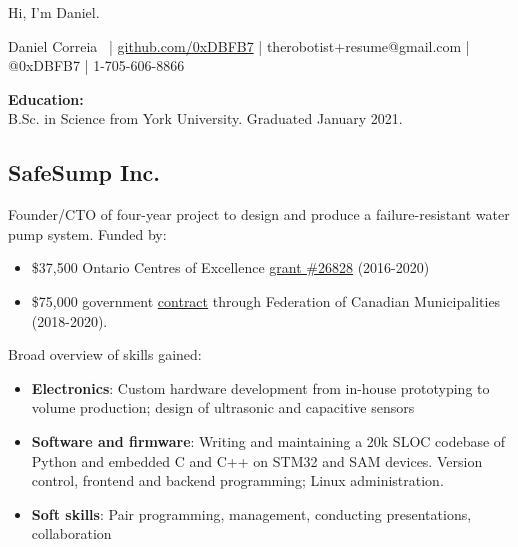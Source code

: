 \documentclass[fleqn,11pt]{article}
\begin{document}
\begingroup
{}\selectfont

{\Huge Hi, I'm Daniel.}

\endgroup


\small{{Daniel Correia}\  | \href{https://github.com/0xDBFB7}{github.com/0xDBFB7} | therobotist+resume@gmail.com | @0xDBFB7 | 1-705-606-8866\\
\light{\makebox[\linewidth]{\rule{\textwidth}{0.4pt}}}

\begin{multicols}{1}

\begin{tcolorbox}
\textbf{Education:\\}
B.Sc. in Science from York University. Graduated January 2021.
\end{tcolorbox}

\subsection*{SafeSump Inc.}

Founder/CTO of four-year project to design and produce a failure-resistant water pump system. Funded by:
%
\begin{itemize}
\item \$37,500 Ontario Centres of Excellence  \href{https://drive.google.com/file/d/1WXrxVwTggaL7WEvLv6DgJ891fSo7LqqP/view?usp=sharing}{grant \#26828} (2016-2020)
\item \$75,000 government \href{https://drive.google.com/file/d/11pdJNzYDE-28X3m0rH8mE4cxoliTJZGH/view?usp=sharing}{contract} through Federation of Canadian Municipalities (2018-2020).
\end{itemize}
Broad overview of skills gained:

\begin{itemize}
	\item \textbf{Electronics}: Custom hardware development from in-house prototyping to volume production; design of ultrasonic and capacitive sensors
	\item \textbf{Software and firmware}: Writing and maintaining a 20k SLOC codebase of Python and embedded C and C++ on STM32 and SAM devices. Version control, frontend and backend programming; Linux administration.
	\item \textbf{Soft skills}: Pair programming, management, conducting presentations, collaboration
\end{itemize}


\end{multicols}}
\end{document}
